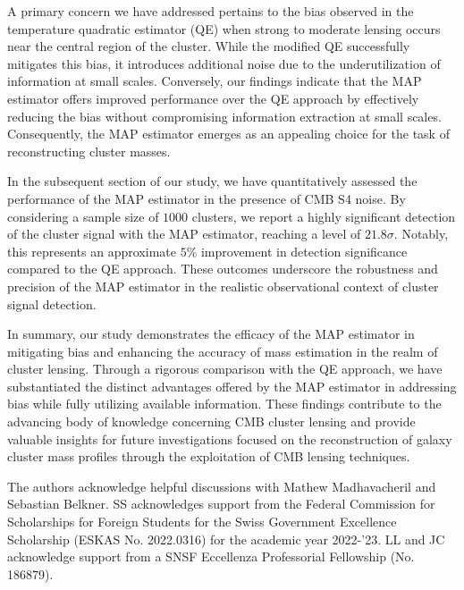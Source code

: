 \documentclass[prd, superscriptaddress, tightenlines, longbibliography, nofootinbib, eqsecnum, amsfonts, amsmath, floatfix, twocolumn, notitlepage]{revtex4-2}
\newcommand{\JC}[1]{\color{purple}{{JC:#1}}\color{black}\xspace}
\begin{document}
A primary concern we have addressed pertains to the bias observed in the temperature quadratic estimator (QE) when strong to moderate lensing occurs near the central region of the cluster. While the modified QE successfully mitigates this bias, it introduces additional noise due to the underutilization of information at small scales. Conversely, our findings indicate that the MAP estimator offers improved performance over the QE approach by effectively reducing the bias without compromising information extraction at small scales. Consequently, the MAP estimator emerges as an appealing choice for the task of reconstructing cluster masses.

In the subsequent section of our study, we have quantitatively assessed the performance of the MAP estimator in the presence of CMB S4 noise. By considering a sample size of $1000$ clusters, we report a highly significant detection of the cluster signal with the MAP estimator, reaching a level of $21.8\sigma$. Notably, this represents an approximate $5\%$ improvement in detection significance compared to the QE approach. These outcomes underscore the robustness and precision of the MAP estimator in the realistic observational context of cluster signal detection.

In summary, our study demonstrates the efficacy of the MAP estimator in mitigating bias and enhancing the accuracy of mass estimation in the realm of cluster lensing. Through a rigorous comparison with the QE approach, we have substantiated the distinct advantages offered by the MAP estimator in addressing bias while fully utilizing available information. These findings contribute to the advancing body of knowledge concerning CMB cluster lensing and provide valuable insights for future investigations focused on the reconstruction of galaxy cluster mass profiles through the exploitation of CMB lensing techniques.
\JC{mention tough aspects like calculation of WF}

\begin{acknowledgements}
The authors acknowledge helpful discussions with Mathew Madhavacheril and Sebastian Belkner. SS acknowledges support from the Federal Commission for Scholarships for Foreign Students for the Swiss Government Excellence Scholarship (ESKAS No. 2022.0316) for the academic year 2022-'23. LL and JC acknowledge support from a SNSF Eccellenza Professorial Fellowship (No. 186879).

\end{acknowledgements}

\appendix
\end{document}
